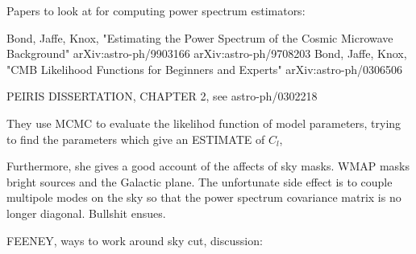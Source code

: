 \documentclass[a4paper, 11pt]{article}
\begin{document}
Papers to look at for computing power spectrum estimators:

Bond, Jaffe, Knox, "Estimating the Power Spectrum of the Cosmic Microwave Background"
arXiv:astro-ph/9903166
arXiv:astro-ph/9708203
Bond, Jaffe, Knox, "CMB Likelihood Functions for Beginners and Experts"  arXiv:astro-ph/0306506

PEIRIS DISSERTATION, CHAPTER 2, see astro-ph/0302218

They use MCMC to evaluate the likelihod function of model parameters, trying to find the parameters which give an ESTIMATE of $C_l$, 

Furthermore, she gives a good account of the affects of sky masks. WMAP masks bright sources and the Galactic plane. The unfortunate side effect is to couple multipole modes on the sky so that the power spectrum covariance matrix is no longer diagonal. Bullshit ensues. 




FEENEY, ways to work around sky cut, discussion: 
\end{document}

